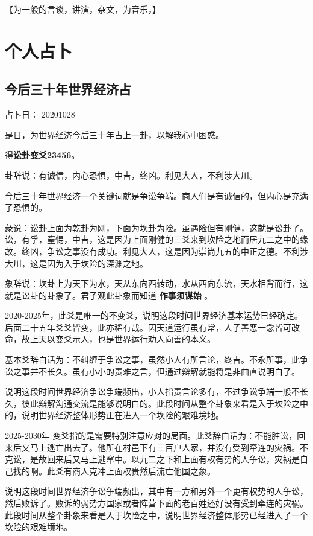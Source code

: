 \documentclass[12pt,oneside]{book}
\begin{document}
【为一般的言谈，讲演，杂文，为音乐，】

\chapter{个人占卜}

\section{今后三十年世界经济占}
占卜日： 20201028

是日，为世界经济今后三十年占上一卦，以解我心中困惑。

得\textbf{讼卦变爻23456}。

卦辞说：有诚信，内心恐惧，中吉，终凶。利见大人，不利涉大川。

今后三十年世界经济一个关键词就是争讼争端。商人们是有诚信的，但内心是充满了恐惧的。

彖说：讼卦上面为乾卦为刚，下面为坎卦为险。虽遇险但有刚健，这就是讼卦了。讼，有孚，窒惕，中吉，这是因为上面刚健的三爻来到坎险之地而居九二之中的缘故。终凶，争讼之事没有成功。利见大人，这是因为崇尚九五的中正之德。不利涉大川，这是因为入于坎险的深渊之地。

象辞说：坎卦上为天下为水，天从东向西转动，水从西向东流，天水相背而行，这就是讼卦的卦象了。君子观此卦象而知道 \textbf{作事须谋始} 。

2020-2025年，此爻是唯一的不变爻，说明这段时间世界经济基本运势已经确定。后面二十五年爻爻皆变，此亦稀有哉。因天道运行虽有常，人子善恶一念皆可改命，故上天以变爻示人，也是世界运行劝人向善的本义。

基本爻辞白话为：不纠缠于争讼之事，虽然小人有所言论，终吉。不永所事，此争讼之事并不长久。虽有小小的责难之言，但通过辩解就能将是非曲直说明白了。

说明这段时间世界经济争讼争端频出，小人指责言论多有，不过争讼争端一般不长久，彼此辩解沟通交流是能够说明白的。此段时间从整个卦象来看是入于坎险之中的，说明世界经济整体形势正在进入一个坎险的艰难境地。

2025-2030年 变爻指的是需要特别注意应对的局面。此爻辞白话为：不能胜讼，回来后又马上逃亡出去了。他所在村邑下有三百户人家，并没有受到牵连的灾祸。不克讼，是故回来后又马上逃窜中。以九二之下和上面有权有势的人争讼，灾祸是自己找的啊。此爻有商人克冲上面权贵然后流亡他国之象。

说明这段时间世界经济争讼争端频出，其中有一方和另外一个更有权势的人争讼，然后败诉了。败诉的弱势方国家或者阵营下面的老百姓还好没有受到牵连的灾祸。此段时间从整个卦象来看是入于坎险之中，说明世界经济整体形势已经进入了一个坎险的艰难境地。
\end{document}
